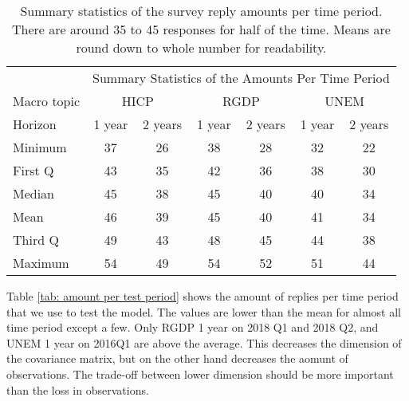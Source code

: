 \documentclass[11pt]{article}
\begin{document}
\begin{table}[!h]
	\centering
	\caption{Summary statistics of the survey reply amounts per time period. There are around 35 to 45 responses for half of the time. Means are round down to whole number for readability.}
	\label{tab: time summary statistics}
	\begin{tabular}{lcccccc}%
		\hline
		&\multicolumn{6}{c}{Summary Statistics of the Amounts Per Time Period}\\
		\cmidrule(lr){2-7}
		Macro topic & \multicolumn{2}{c}{HICP} & \multicolumn{2}{c}{RGDP} & \multicolumn{2}{c}{UNEM} \\
		\cmidrule(lr){2-3} \cmidrule(lr){4-5}\cmidrule(lr){6-7}
		Horizon     & 1 year & 2 years & 1 year & 2 years & 1 year & 2 years \\ 
		\hline
		Minimum & 37    & 26    & 38    & 28    & 32    & 22    \\
		First Q & 43    & 35    & 42    & 36    & 38    & 30    \\
		Median  & 45    & 38    & 45    & 40    & 40    & 34    \\
		Mean    & 46    & 39    & 45    & 40    & 41    & 34    \\
		Third Q & 49    & 43    & 48    & 45    & 44    & 38    \\
		Maximum & 54    & 49    & 54    & 52    & 51    & 44       \\ 
		\hline
	\end{tabular}
\end{table}

Table \ref{tab: amount per test period} shows the amount of replies per time period that we use to test the model. The values are lower than the mean for almost all time period except a few. Only RGDP 1 year on 2018 Q1 and 2018 Q2, and UNEM 1 year on 2016Q1 are above the average. This decreases the dimension of the covariance matrix, but on the other hand decreases the aomunt of observations. The trade-off between lower dimension should be more important than the loss in observations.
\end{document}
